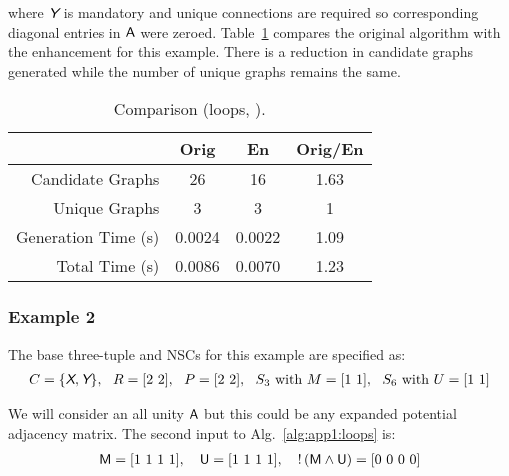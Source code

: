 \noindent where $\textsl{\textsf{Y}}$ is mandatory and unique connections are required so corresponding diagonal entries in $\textup{\textsf{A}}$ were zeroed. Table~\ref{tb:app1:loops-ex1} compares the original algorithm with the enhancement for this example. There is a reduction in candidate graphs generated while the number of unique graphs remains the same.

\begin{table}[!ht]
\centering
\caption{Comparison (loops, ).\label{tb:app1:loops-ex1}}
\begin{tabular}{r | c | c | c}
\hline \hline
& Orig & En & Orig/En \\
\hline
Candidate Graphs & 26 & 16 & 1.63 \\ 
Unique Graphs & 3 & 3 & 1 \\
Generation Time (s) & 0.0024 & 0.0022 & 1.09 \\
Total Time (s) & 0.0086 & 0.0070 & 1.23 \\
\hline \hline
\end{tabular}
\end{table}

\subsubsection{Example 2\label{sec:app1:loops-ex2}}

The base three-tuple and NSCs for this example are specified as:
\begin{align}
C = \{ \xcolor{X}, \xcolor{Y} \}, \ \ R = [2\ 2], \ \ P = [2\ 2], \ \ S_3 \text{ with } M = [1\ 1], \ \ S_6 \text{ with } U = [1\ 1]
\end{align}

\noindent We will consider an all unity $\textup{\textsf{A}}$ but this could be any expanded potential adjacency matrix. The second input to Alg.~\ref{alg:app1:loops} is:
\begin{align}
\textup{\textsf{M}} = [1\ 1\ 1\ 1], \quad \textup{\textsf{U}} = [1\ 1\ 1\ 1], \quad !\left(\textup{\textsf{M}} \land \textup{\textsf{U}}\right) = [0\ 0\ 0\ 0]
\end{align}

